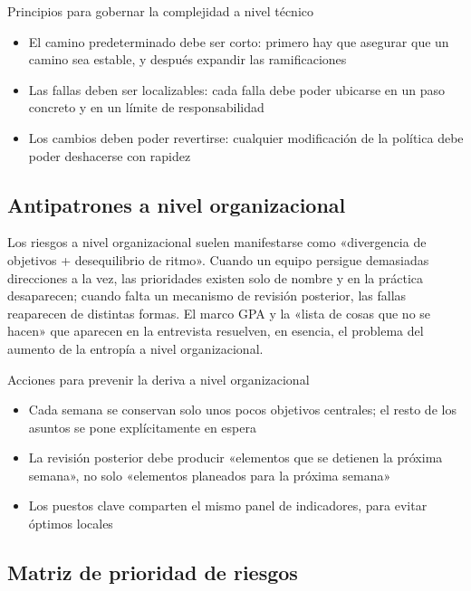 \begin{knowledgebox}{Principios para gobernar la complejidad a nivel técnico}
\begin{itemize}
    \item El camino predeterminado debe ser corto: primero hay que asegurar que un camino sea estable, y después expandir las ramificaciones
    \item Las fallas deben ser localizables: cada falla debe poder ubicarse en un paso concreto y en un límite de responsabilidad
    \item Los cambios deben poder revertirse: cualquier modificación de la política debe poder deshacerse con rapidez
\end{itemize}
\end{knowledgebox}

\subsection{Antipatrones a nivel organizacional}

Los riesgos a nivel organizacional suelen manifestarse como «divergencia de objetivos + desequilibrio de ritmo». Cuando un equipo persigue demasiadas direcciones a la vez, las prioridades existen solo de nombre y en la práctica desaparecen; cuando falta un mecanismo de revisión posterior, las fallas reaparecen de distintas formas. El marco GPA y la «lista de cosas que no se hacen» que aparecen en la entrevista resuelven, en esencia, el problema del aumento de la entropía a nivel organizacional.

\begin{importantbox}{Acciones para prevenir la deriva a nivel organizacional}
\begin{itemize}
    \item Cada semana se conservan solo unos pocos objetivos centrales; el resto de los asuntos se pone explícitamente en espera
    \item La revisión posterior debe producir «elementos que se detienen la próxima semana», no solo «elementos planeados para la próxima semana»
    \item Los puestos clave comparten el mismo panel de indicadores, para evitar óptimos locales
\end{itemize}
\end{importantbox}

\subsection{Matriz de prioridad de riesgos}

